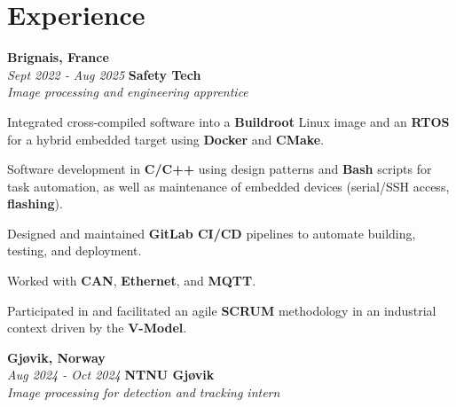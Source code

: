 
    \section{Experience}
        \begin{twocolentry}{
			\textbf{Brignais, France} \\
			\textit{Sept 2022 - Aug 2025}
            }{
            \textbf{Safety Tech} \\
            \textit{Image processing and engineering apprentice}
            }
        \end{twocolentry}

        \begin{onecolentry}
            \begin{highlights}
                \item Integrated cross-compiled software into a \textbf{Buildroot} Linux image and an \textbf{RTOS} for a hybrid embedded target using \textbf{Docker} and \textbf{CMake}.
                \item Software development in \textbf{C/C++} using design patterns and \textbf{Bash} scripts for task automation, as well as maintenance of embedded devices (serial/SSH access, \textbf{flashing}).
                \item Designed and maintained \textbf{GitLab CI/CD} pipelines to automate building, testing, and deployment.
                \item Worked with \textbf{CAN}, \textbf{Ethernet}, and \textbf{MQTT}.
                \item Participated in and facilitated an agile \textbf{SCRUM} methodology in an industrial context driven by the \textbf{V-Model}.
            \end{highlights}
        \end{onecolentry}

        \begin{twocolentry}{
			\textbf{Gjøvik, Norway} \\
			\textit{Aug 2024 - Oct 2024}
            }{
			\textbf{NTNU Gjøvik} \\
			\textit{Image processing for detection and tracking intern}
            }
        \end{twocolentry}

